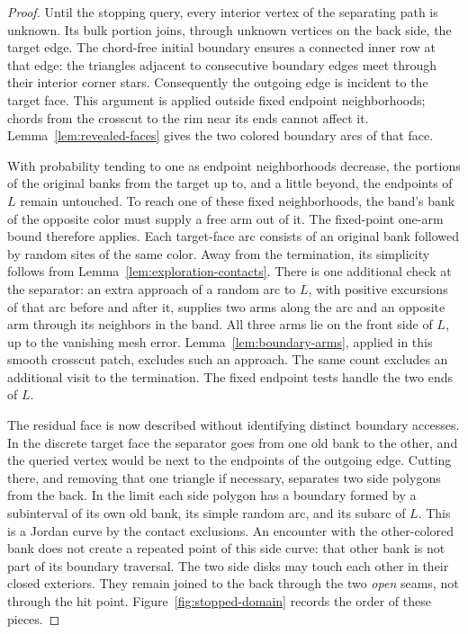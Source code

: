 \begin{proof}
Until the stopping query, every interior vertex of the separating
path is unknown.  Its bulk portion joins, through unknown vertices
on the back side, the target edge.  The chord-free initial boundary
ensures a connected inner row at that edge: the triangles adjacent
to consecutive boundary edges meet through their interior corner
stars.  Consequently the outgoing edge is incident to the target
face.  This argument is applied outside fixed endpoint
neighborhoods; chords from the crosscut to the rim near its ends
cannot affect it.  Lemma~\ref{lem:revealed-faces} gives the two
colored boundary arcs of that face.

With probability tending to one as endpoint neighborhoods decrease,
the portions of the original banks from the target up to, and a
little beyond, the endpoints of $L$ remain untouched.  To reach one
of these fixed neighborhoods, the band's bank of the opposite color
must supply a free arm out of it.  The fixed-point one-arm bound
therefore applies.  Each target-face arc consists of an original
bank followed by random sites of the same color.  Away from the
termination, its simplicity follows from
Lemma~\ref{lem:exploration-contacts}.  There is one additional check
at the separator: an extra approach of a random arc to $L$, with
positive excursions of that arc before and after it, supplies two
arms along the arc and an opposite arm through its neighbors in the
band.  All three arms lie on the front side of $L$, up to the
vanishing mesh error.  Lemma~\ref{lem:boundary-arms}, applied in
this smooth crosscut patch, excludes such an approach.  The same
count excludes an additional visit to the termination.  The fixed
endpoint tests handle the two ends of $L$.

The residual face is now described without identifying distinct
boundary accesses.  In the discrete target face the separator goes
from one old bank to the other, and the queried vertex would be
next to the endpoints of the outgoing edge.  Cutting there, and
removing that one triangle if necessary, separates two side
polygons from the back.  In the limit each side polygon has a
boundary formed by a subinterval of its own old bank, its simple
random arc, and its subarc of $L$.  This is a Jordan curve by the
contact exclusions.  An encounter with the other-colored bank does
not create a repeated point of this side curve: that other bank is
not part of its boundary traversal.  The two side disks may touch
each other in their closed exteriors.  They remain joined to the
back through the two \emph{open} seams, not through the hit point.
Figure~\ref{fig:stopped-domain} records the order of these pieces.


\end{proof}
